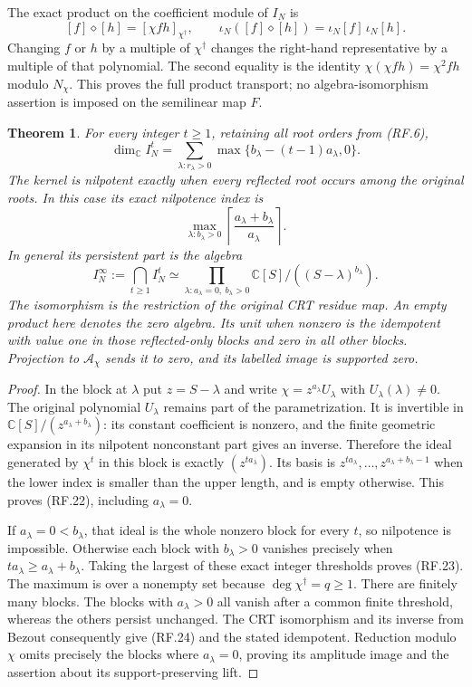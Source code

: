 \documentclass[11pt]{article}
\newtheorem{theorem}{Theorem}
\newcommand{\C}{\mathbb C}
\newcommand{\A}{\mathcal A}
\begin{document}
The exact product on the coefficient module of $I_N$ is
\[
 [f]\diamond[h]=[\chi fh]_{\chi^\dagger},\qquad
 \iota_N([f]\diamond[h])=\iota_N[f]\,\iota_N[h].
 \tag{RF.21}
\]
Changing $f$ or $h$ by a multiple of $\chi^\dagger$ changes the
right-hand representative by a multiple of that polynomial.
The second equality is the identity $\chi(\chi fh)=\chi^2fh$
modulo $N_\chi$. This proves the full product transport; no
algebra-isomorphism assertion is imposed on the semilinear map $F$.

\begin{theorem}
For every integer $t\ge1$, retaining all root orders from (RF.6),
\[
 \dim_{\C} I_N^t
    =\sum_{\lambda:r_\lambda>0}
       \max\{b_\lambda-(t-1)a_\lambda,0\}.
 \tag{RF.22}
\]
The kernel is nilpotent exactly when every reflected root occurs
among the original roots. In this case its exact nilpotence index is
\[
 \max_{\lambda:b_\lambda>0}
       \left\lceil\frac{a_\lambda+b_\lambda}{a_\lambda}\right\rceil.
 \tag{RF.23}
\]
In general its persistent part is the algebra
\[
 I_N^\infty:=\bigcap_{t\ge1}I_N^t
   \simeq\prod_{\lambda:a_\lambda=0,\ b_\lambda>0}
           \C[S]/((S-\lambda)^{b_\lambda}).
 \tag{RF.24}
\]
The isomorphism is the restriction of the original CRT residue map.
An empty product here denotes the zero algebra. Its unit when
nonzero is the idempotent with value one in those reflected-only
blocks and zero in all other blocks. Projection to $\A_\chi$
sends it to zero, and its labelled image is supported zero.
\end{theorem}

\begin{proof}
In the block at $\lambda$ put $z=S-\lambda$ and write
$\chi=z^{a_\lambda}U_\lambda$ with $U_\lambda(\lambda)\ne0$.
The original polynomial $U_\lambda$ remains part of the
parametrization. It is invertible in
$\C[S]/(z^{a_\lambda+b_\lambda})$: its constant coefficient
is nonzero, and the finite geometric expansion in its nilpotent
nonconstant part gives an inverse. Therefore the ideal generated
by $\chi^t$ in this block is exactly $(z^{t a_\lambda})$.
Its basis is $z^{t a_\lambda},\ldots,
z^{a_\lambda+b_\lambda-1}$ when the lower index is smaller
than the upper length, and is empty otherwise. This proves
(RF.22), including $a_\lambda=0$.

If $a_\lambda=0<b_\lambda$, that ideal is the whole nonzero
block for every $t$, so nilpotence is impossible. Otherwise
each block with $b_\lambda>0$ vanishes precisely when
$t a_\lambda\ge a_\lambda+b_\lambda$. Taking the largest
of these exact integer thresholds proves (RF.23). The maximum
is over a nonempty set because $\deg\chi^\dagger=q\ge1$.
There are finitely many blocks. The blocks with $a_\lambda>0$
all vanish after a common finite threshold, whereas the others
persist unchanged. The CRT isomorphism and its inverse from
Bezout consequently give (RF.24) and the stated idempotent.
Reduction modulo $\chi$ omits precisely the blocks where
$a_\lambda=0$, proving its amplitude image and the assertion
about its support-preserving lift.
\end{proof}
\end{document}

